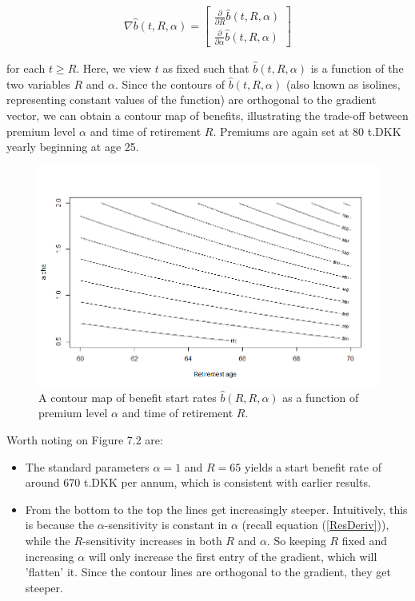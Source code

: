 \documentclass{article}
\newcommand{\1}[1]{\mathbbm{1}_{\left\lbrace #1 \right\rbrace}}
\theoremstyle{break}
\theoremstyle{remark}
\numberwithin{equation}{section}
\begin{document}
\begin{align*}
	\nabla \hat{b}(t,R,\alpha) =
	\begin{bmatrix}
		\frac{\partial}{\partial R }\hat{b}(t,R,\alpha) \\
		\frac{\partial}{\partial \alpha }\hat{b}(t,R,\alpha)
	\end{bmatrix}
\end{align*}

for each $t \geq R$. Here, we view $t$ as fixed such that $\hat{b}(t,R,\alpha)$ is a function of the two variables $R$ and $\alpha$. Since the contours of $\hat{b}(t,R,\alpha)$ (also known as isolines, representing constant values of the function) are orthogonal to the gradient vector, we can obtain a contour map of benefits, illustrating the trade-off between premium level $\alpha$ and time of retirement $R$. Premiums are again set at 80 t.DKK yearly beginning at age 25.

\begin{figure}[H] \label{ContourGraph}
	\centering
	\caption{A contour map of benefit start rates $\hat{b}(R,R,\alpha)$ as a function of premium level $\alpha$ and time of retirement $R$.}
	\includegraphics[width=\textwidth]{Contour}		
\end{figure}

Worth noting on Figure 7.2 are:

\begin{itemize}
	\item The standard parameters $\alpha=1$ and $R=65$ yields a start benefit rate of around 670 t.DKK per annum, which is consistent with earlier results.
	\item From the bottom to the top the lines get increasingly steeper. Intuitively, this is because the $\alpha$-sensitivity is constant in $\alpha$ (recall equation (\ref{ResDeriv})), while the $R$-sensitivity increases in both $R$ and $\alpha$. So keeping $R$ fixed and increasing $\alpha$ will only increase the first entry of the gradient, which will 'flatten' it. Since the contour lines are orthogonal to the gradient, they get steeper.
\end{itemize}
\end{document}
